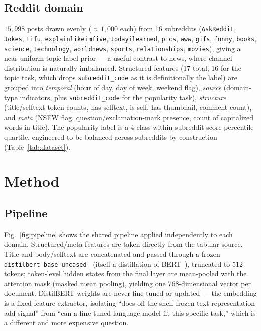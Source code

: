 \documentclass[conference]{IEEEtran}
\begin{document}
\subsection{Reddit domain}
$15{,}998$ posts drawn evenly ($\approx\!1{,}000$ each) from 16 subreddits (\texttt{AskReddit}, \texttt{Jokes}, \texttt{tifu}, \texttt{explainlikeimfive}, \texttt{todayilearned}, \texttt{pics}, \texttt{aww}, \texttt{gifs}, \texttt{funny}, \texttt{books}, \texttt{science}, \texttt{technology}, \texttt{worldnews}, \texttt{sports}, \texttt{relationships}, \texttt{movies}), giving a near-uniform topic-label prior --- a useful contrast to news, where channel distribution is naturally imbalanced. Structured features (17 total; 16 for the topic task, which drops \texttt{subreddit\_code} as it is definitionally the label) are grouped into \emph{temporal} (hour of day, day of week, weekend flag), \emph{source} (domain-type indicators, plus \texttt{subreddit\_code} for the popularity task), \emph{structure} (title/selftext token counts, has-selftext, is-self, has-thumbnail, comment count), and \emph{meta} (NSFW flag, question/exclamation-mark presence, count of capitalized words in title). The popularity label is a 4-class within-subreddit score-percentile quartile, engineered to be balanced across subreddits by construction (Table~\ref{tab:dataset}).

\section{Method}

\subsection{Pipeline}
Fig.~\ref{fig:pipeline} shows the shared pipeline applied independently to each domain. Structured/meta features are taken directly from the tabular source. Title and body/selftext are concatenated and passed through a frozen \texttt{distilbert-base-uncased}~\cite{sanh2019distilbert} (itself a distillation of BERT~\cite{devlin2019bert}), truncated to 512 tokens; token-level hidden states from the final layer are mean-pooled with the attention mask (masked mean pooling), yielding one 768-dimensional vector per document. DistilBERT weights are never fine-tuned or updated --- the embedding is a fixed feature extractor, isolating ``does off-the-shelf frozen text representation add signal'' from ``can a fine-tuned language model fit this specific task,'' which is a different and more expensive question.
\end{document}
